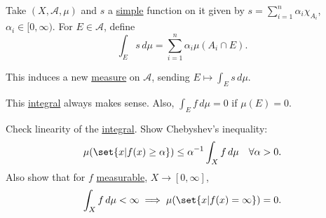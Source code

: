 \documentclass[twoside]{article}
\begin{document}
\begin{defi}
    Take  $(X, \mathscr{A}, \mu)$ and $s$ a \hyperlink{def:simple}{simple} function on it given by $s=\sum_{i=1}^n \alpha_i \chi_{A_i}$, $\alpha_i \in [0, \infty)$.
    For $E \in \mathscr{A}$, define
    \begin{equation*}
        \int_E s \, d\mu = \sum_{i=1}^n \alpha_i \mu(A_i \cap E).
    \end{equation*}
\end{defi}
\begin{remark}
    This induces a new \hyperlink{def:measure}{measure} on $\mathscr{A}$, sending $E \mapsto \int_E s \, d\mu$.
\end{remark}

\begin{remark}
    This \hyperlink{def:integral}{integral} always makes sense. Also, $\int_E f \, d\mu = 0$ if $\mu(E) = 0$.
\end{remark}
\begin{ex}
    Check linearity of the \hyperlink{def:integral}{integral}. Show \hypertarget{def:chebyshev}{Chebyshev's inequality:}
    \begin{equation*}
        \mu(\set{x | f(x) \geq \alpha}) \leq \alpha^{-1} \int_X f \, d\mu \quad \forall \alpha > 0.
    \end{equation*}
    Also show that for $f$ \hyperlink{def:measFunc}{measurable}, $X \to [0, \infty]$,
    \begin{equation*}\int_X f \, d\mu < \infty \implies \mu(\set{x | f(x) = \infty}) = 0.\end{equation*}
\end{ex}
\end{document}
